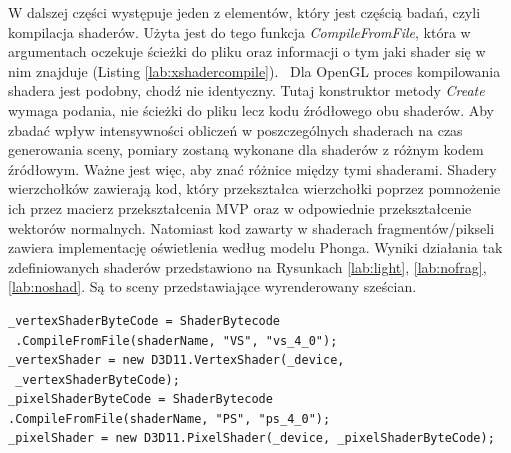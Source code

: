 \documentclass[archive]{mgr}
\begin{document}
W dalszej części występuje jeden z elementów, który jest częścią badań, czyli kompilacja shaderów. Użyta jest do tego funkcja \emph{CompileFromFile}, która w argumentach oczekuje ścieżki do pliku oraz informacji o tym jaki shader się w nim znajduje (Listing \ref{lab:xshadercompile}). \
Dla OpenGL proces kompilowania shadera jest podobny, chodź nie identyczny. Tutaj konstruktor metody \emph{Create} wymaga podania, nie ścieżki do pliku lecz kodu źródłowego obu shaderów. Aby zbadać wpływ intensywności obliczeń w poszczególnych shaderach na czas generowania sceny, pomiary zostaną wykonane dla shaderów z różnym kodem źródłowym. Ważne jest więc, aby znać różnice między tymi shaderami. Shadery wierzchołków zawierają kod, który przekształca wierzchołki poprzez pomnożenie ich przez macierz przekształcenia MVP oraz w odpowiednie przekształcenie wektorów normalnych. Natomiast kod zawarty w shaderach fragmentów/pikseli zawiera implementację oświetlenia według modelu Phonga. Wyniki działania tak zdefiniowanych shaderów przedstawiono na Rysunkach \ref{lab:light}, \ref{lab:nofrag}, \ref{lab:noshad}. Są to sceny przedstawiające wyrenderowany sześcian.

\begin{lstlisting}[caption={Kompilacja Shaderów – DirectX},captionpos=b,label={lab:xshadercompile}]
 _vertexShaderByteCode = ShaderBytecode
 .CompileFromFile(shaderName, "VS", "vs_4_0");
_vertexShader = new D3D11.VertexShader(_device,
 _vertexShaderByteCode);
_pixelShaderByteCode = ShaderBytecode
.CompileFromFile(shaderName, "PS", "ps_4_0");
_pixelShader = new D3D11.PixelShader(_device, _pixelShaderByteCode);
\end{lstlisting}
\end{document}
